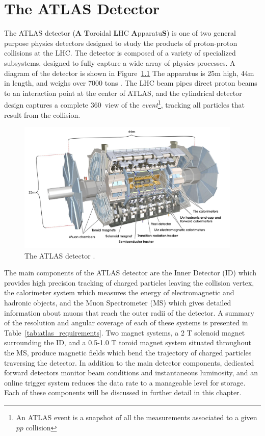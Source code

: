 \chapter{The ATLAS Detector}

\indent The ATLAS detector (\textbf{A} \textbf{T}oroidal \textbf{L}HC \textbf{A}pparatu\textbf{S}) is one of two general purpose physics detectors designed to study the products of proton-proton collisions at the LHC. The detector is composed of a variety of specialized subsystems, designed to fully capture a wide array of physics processes. A diagram of the detector is shown in Figure~\ref{fig:atlas_detector} The apparatus is 25m high, 44m in length, and weighs over 7000 tons \cite{atlas_overview}. The LHC beam pipes direct proton beams to an interaction point at the center of ATLAS, and the cylindrical detector design captures a complete 360\degree\ view of the \textit{event}\footnote{An ATLAS event is a snapshot of all the measurements associated to a given $pp$ collision}, tracking all particles that result from the collision.\par

\begin{figure}[!htbp]
        \centering
	\includegraphics[width=0.95\textwidth]{figures/ch4/atlas_detector}
	\caption{The ATLAS detector \cite{atlas_overview}.}
	\label{fig:atlas_detector}
\end{figure}
\clearpage

\indent The main components of the ATLAS detector are the Inner Detector (ID) which provides high precision tracking of charged particles leaving the collision vertex, the calorimeter system which measures the energy of electromagnetic and hadronic objects, and the Muon Spectrometer (MS) which gives detailed information about muons that reach the outer radii of the detector. A summary of the resolution and angular coverage of each of these systems is presented in Table~\ref{tab:atlas_requirements}. Two magnet systems, a 2 T solenoid magnet surrounding the ID, and a 0.5-1.0 T toroid magnet system situated throughout the MS, produce magnetic fields which bend the trajectory of charged particles traversing the detector. In addition to the main detector components, dedicated forward detectors monitor beam conditions and instantaneous luminosity, and an online trigger system reduces the data rate to a manageable level for storage. Each of these components will be discussed in further detail in this chapter. \par

